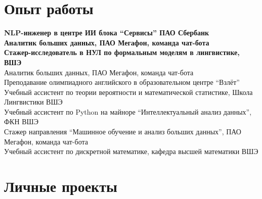 \documentclass[11pt]{article} %
\begin{document}

\section*{Опыт работы}

 \textbf{NLP-инженер в центре ИИ блока ``Сервисы'' ПАО Сбербанк}\\
 \textbf{Аналитик больших данных, ПАО Мегафон, команда чат-бота}\\
 \textbf{Стажер-исследователь в НУЛ по формальным моделям в лингвистике, ВШЭ}\\
 Аналитик больших данных, ПАО Мегафон, команда чат-бота\\
 Преподавание олимпиадного английского в образовательном центре ``Взлёт''\\
 Учебный ассистент по теории вероятности и математической статистике, Школа Лингвистики ВШЭ\\
 Учебный ассистент по Python на майноре ``Интеллектуальный анализ данных'', ФКН ВШЭ\\
 Стажер направления ``Машинное обучение и анализ больших данных'', ПАО Мегафон, команда чат-бота\\
 Учебный ассистент по дискретной математике, кафедра высшей математики ВШЭ



\section*{Личные проекты}
\end{document}
